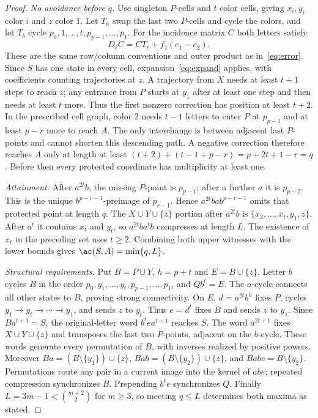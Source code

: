 \begin{proof}
\emph{No avoidance before $q$.}
Use singleton $P$-cells and $t$ color cells, giving $x_i,y_i$ color $i$
and $z$ color $1$. Let $T_a$ swap the last two $P$-cells and cycle the colors,
and let $T_b$ cycle $p_0,1,\ldots,t,p_{p-1},\ldots,p_1$.
For the incidence matrix $C$ both letters satisfy
\[
 D_\ell C=CT_\ell+f_z(e_1-e_2).
\]
These are the same row/column conventions and outer product as in~\eqref{eq:error}.
Since $S$ has one state in every cell, expansion~\eqref{eq:expand} applies,
with coefficients counting trajectories at $z$.
A trajectory from $X$ needs at least $t+1$ steps to reach $z$;
any entrance from $P$ starts at $y_1$ after at least one step and then needs
at least $t$ more. Thus the first nonzero correction has position at least $t+2$.
In the prescribed cell graph, color $2$ needs $t-1$ letters to enter $P$
at $p_{p-1}$ and at least $p-r$ more to reach $A$.
The only interchange is between adjacent last $P$-points and cannot shorten
this descending path. A negative correction therefore reaches $A$ only at
length at least $(t+2)+(t-1+p-r)=p+2t+1-r=q$.
Before then every protected coordinate has multiplicity at least one.

\emph{Attainment.}
After $a^{2t}b$, the missing $P$-point is $p_{p-1}$; after a further $a$
it is $p_{p-2}$. This is the unique $b^{p-r-1}$-preimage of $p_{r-1}$.
Hence $a^{2t}bab^{p-r-1}$ omits that protected point at length $q$.
The $X\cup Y\cup\{z\}$ portion after $a^{2t}b$ is
$\{x_2,\ldots,x_t,y_1,z\}$. After $a^t$ it contains $x_t$ and $y_t$,
so $a^{2t}ba^tb$ compresses at length $L$.
The existence of $x_t$ in the preceding set uses $t\ge2$.
Combining both upper witnesses with the lower bounds gives $\ac(S,A)=\min\{q,L\}$.

\emph{Structural requirements.}
Put $B=P\cup Y$, $h=p+t$ and $E=B\cup\{z\}$.
Letter $b$ cycles $B$ in the order $p_0,y_1,\ldots,y_t,p_{p-1},\ldots,p_1$,
and $Qb^t=E$. The $a$-cycle connects all other states to $B$, proving
strong connectivity.
On $E$, $d=a^{2t}b^h$ fixes $P$, cycles $y_1\to y_t\to\cdots\to y_1$,
and sends $z$ to $y_t$. Thus $e=d^t$ fixes $B$ and sends $z$ to $y_1$.
Since $Ba^{t+1}=S$, the original-letter word $b^tea^{t+1}$ reaches $S$.
The word $a^{2t+1}$ fixes $X\cup Y\cup\{z\}$ and transposes the last two
$P$-points, adjacent on the $b$-cycle. These words generate every permutation
of $B$, with inverses realized by positive powers.
Moreover $Ba=(B\setminus\{y_1\})\cup\{z\}$,
$Bab=(B\setminus\{y_2\})\cup\{z\}$, and $Babe=B\setminus\{y_2\}$.
Permutations route any pair in a current image into the kernel of $abe$;
repeated compression synchronizes $B$. Prepending $b^te$ synchronizes $Q$.
Finally $L=3m-1<\binom{m+2}{2}$ for $m\ge3$, so meeting $q\le L$
determines both maxima as stated.
\end{proof}
